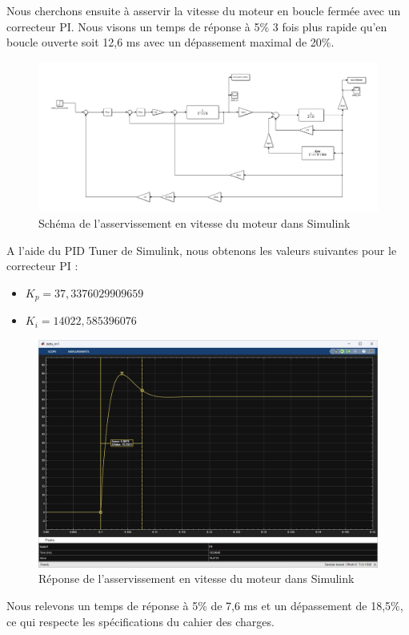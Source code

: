 Nous cherchons ensuite à asservir la vitesse du moteur en boucle fermée avec un correcteur PI. Nous visons un temps de réponse à 5\% 3 fois plus rapide qu'en boucle ouverte soit 12,6 ms avec un dépassement maximal de 20\%.
\begin{figure}[H]
    \centering
    \includegraphics[width=1\textwidth]{images/asserv_de_vitesse_tachy/Simulink_boucle_de_courant_vitesse.png}
    \caption{Schéma de l'asservissement en vitesse du moteur dans Simulink}
    \label{fig:asservissement_vitesse_simulink_schema}
\end{figure}
A l'aide du PID Tuner de Simulink, nous obtenons les valeurs suivantes pour le correcteur PI :
\begin{itemize}
    \item $K_p = 37,3376029909659$
    \item $K_i = 14022,585396076$
\end{itemize}
\begin{figure}[H]
    \centering
    \includegraphics[width=1\textwidth]{images/asserv_de_vitesse_tachy/Vitesse_tr5_BF.png}
    \caption{Réponse de l'asservissement en vitesse du moteur dans Simulink}
    \label{fig:reponse_asservissement_vitesse_simulink}
\end{figure}
Nous relevons un temps de réponse à 5\% de 7,6 ms et un dépassement de 18,5\%, ce qui respecte les spécifications du cahier des charges.

